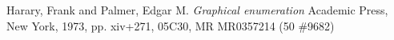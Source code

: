 \documentclass[12pt]{article}
\begin{document}

\providecommand{\bysame}{\leavevmode\hbox to3em{\hrulefill}\thinspace}
\providecommand{\MR}{\relax\ifhmode\unskip\space\fi MR }
\providecommand{\MRhref}[2]{%
  \href{http://www.ams.org/mathscinet-getitem?mr=#1}{#2}
}
\providecommand{\href}[2]{#2}
\begin{thebibliography}{10}


Harary, Frank and Palmer, Edgar M.
     \emph{Graphical enumeration}
 Academic Press, New York, 1973, pp. xiv+271, 05C30, \MR{MR0357214} (50 \#9682)


\end{thebibliography}
\end{document}
